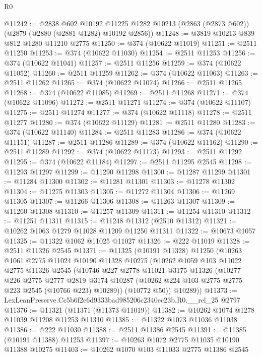 \begin{lexlean}{R0}
\begin{coremodule}
@11242 := @2838
    @602
    @10192
    @11225
    @1282
    @10213
    (@2863 (@2873 @602))
    (@2879 (@2880 (@2881 @1282) @10192 @2856))
@11248 := @3819 @10213 @839 @812 @1280 @11210 @2775
@11250 := @374 (@10622 @11019)
@11251 := @2511 @11250
@11253 := @374 (@10622 @11030)
@11254 := @2511 @11253
@11256 := @374 (@10622 @11041)
@11257 := @2511 @11256
@11259 := @374 (@10622 @11052)
@11260 := @2511 @11259
@11262 := @374 (@10622 @11063)
@11263 := @2511 @11262
@11265 := @374 (@10622 @11074)
@11266 := @2511 @11265
@11268 := @374 (@10622 @11085)
@11269 := @2511 @11268
@11271 := @374 (@10622 @11096)
@11272 := @2511 @11271
@11274 := @374 (@10622 @11107)
@11275 := @2511 @11274
@11277 := @374 (@10622 @11118)
@11278 := @2511 @11277
@11280 := @374 (@10622 @11129)
@11281 := @2511 @11280
@11283 := @374 (@10622 @11140)
@11284 := @2511 @11283
@11286 := @374 (@10622 @11151)
@11287 := @2511 @11286
@11289 := @374 (@10622 @11162)
@11290 := @2511 @11289
@11292 := @374 (@10622 @11173)
@11293 := @2511 @11292
@11295 := @374 (@10622 @11184)
@11297 := @2511 @11295 @2545
@11298 := @11293 @11297
@11299 := @11290 @11298
@11300 := @11287 @11299
@11301 := @11284 @11300
@11302 := @11281 @11301
@11303 := @11278 @11302
@11304 := @11275 @11303
@11305 := @11272 @11304
@11306 := @11269 @11305
@11307 := @11266 @11306
@11308 := @11263 @11307
@11309 := @11260 @11308
@11310 := @11257 @11309
@11311 := @11254 @11310
@11312 := @11251 @11311
@11315 := @11248 @11312 (@2510 @11312)
@11321 := @10262 @1063 @1279 @11028 @11209 @11250 @11311
@11322 := @10673 @1057
@11325 := @11322 @1062 @11025 @11027
@11326 := @222 @11019
@11328 := @2511 @11326 @2545
@11371 := @11325
    (@10191 @11328)
    @11250
    (@10263
      @1061
      @2775
      @11024
      @10190
      @11328
      @10275
      (@10262
        @1059
        @103
        @11022
        @2775
        @11326
        @2545
        (@10746
          @227
          @2778
          @11021
          @3175
          @11326
          (@10277
            @226
            @2775
            @2777
            @2819
            @3174
            @10287
            (@10262 @224 @103 @2775 @2775 @223 @2545 (@10766 @223) @10289))
          (@10772 @50))
        @10289))
@11373 := LexLeanPreserve.Cc5b6f2e6d9333bad985206c2340ec23b.R0.__rel_25 @2797
@11376 := @11321 (@11371 (@11373 @11019))
@11382 := @10262 @1074 @1278 @11039 @11208 @11253 @11310
@11385 := @11322 @1073 @11036 @11038
@11386 := @222 @11030
@11388 := @2511 @11386 @2545
@11391 := @11385 (@10191 @11388) @11253
@11397 := @10263 @1072 @2775 @11035 @10190 @11388 @10275
@11403 := @10262 @1070 @103 @11033 @2775 @11386 @2545

\end{coremodule}
\end{lexlean}
